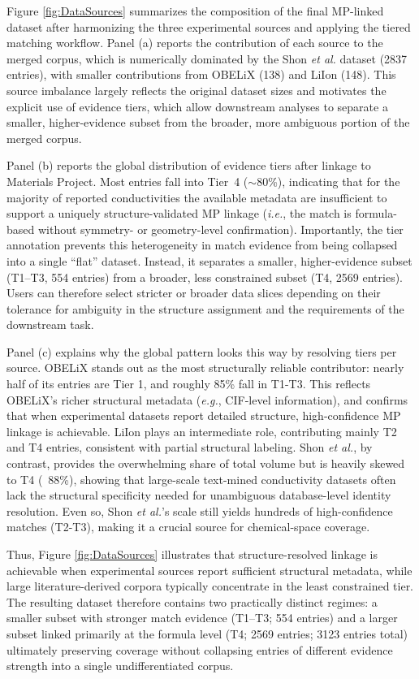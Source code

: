 \documentclass[a4paper,fleqn]{cas-sc}
\begin{document}
Figure \ref{fig:DataSources} summarizes the composition of the final MP-linked dataset after harmonizing the three experimental sources and applying the tiered matching workflow. Panel (a) reports the contribution of each source to the merged corpus, which is numerically dominated by the Shon \textit{et al.} dataset (2837 entries), with smaller contributions from OBELiX (138) and LiIon (148). This source imbalance largely reflects the original dataset sizes and motivates the explicit use of evidence tiers, which allow downstream analyses to separate a smaller, higher-evidence subset from the broader, more ambiguous portion of the merged corpus. 

Panel (b) reports the global distribution of evidence tiers after linkage to Materials Project. Most entries fall into Tier~4 ($\sim$80\%), indicating that for the majority of reported conductivities the available metadata are insufficient to support a uniquely structure-validated MP linkage (\textit{i.e.}, the match is formula-based without symmetry- or geometry-level confirmation). Importantly, the tier annotation prevents this heterogeneity in match evidence from being collapsed into a single ``flat'' dataset. Instead, it separates a smaller, higher-evidence subset (T1--T3, 554 entries) from a broader, less constrained subset (T4, 2569 entries). Users can therefore select stricter or broader data slices depending on their tolerance for ambiguity in the structure assignment and the requirements of the downstream task. 

Panel (c) explains why the global pattern looks this way by resolving tiers per source. OBELiX stands out as the most structurally reliable contributor: nearly half of its entries are Tier 1, and roughly 85\% fall in T1-T3. This reflects OBELiX's richer structural metadata (\textit{e.g.}, CIF-level information), and confirms that when experimental datasets report detailed structure, high-confidence MP linkage is achievable. LiIon plays an intermediate role, contributing mainly T2 and T4 entries, consistent with partial structural labeling. Shon \textit{et al.}, by contrast, provides the overwhelming share of total volume but is heavily skewed to T4 (~88\%), showing that large-scale text-mined conductivity datasets often lack the structural specificity needed for unambiguous database-level identity resolution. Even so, Shon \textit{et al.}'s scale still yields hundreds of high-confidence matches (T2-T3), making it a crucial source for chemical-space coverage.

Thus, Figure \ref{fig:DataSources} illustrates that structure-resolved linkage is achievable when experimental sources report sufficient structural metadata, while large literature-derived corpora typically concentrate in the least constrained tier. The resulting dataset therefore contains two practically distinct regimes: a smaller subset with stronger match evidence (T1--T3; 554 entries) and a larger subset linked primarily at the formula level (T4; 2569 entries; 3123 entries total) ultimately preserving coverage without collapsing entries of different evidence strength into a single undifferentiated corpus.
\end{document}
